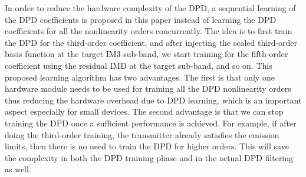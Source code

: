 \documentclass[9pt,conference]{IEEEtran}
\begin{document}
\begin{spacing}{0.88}
In order to reduce the hardware complexity of the DPD, a sequential learning of the DPD coefficients is proposed in this paper instead of learning the DPD coefficients for all the nonlinearity orders concurrently. The idea is to first train the DPD for the third-order coefficient, and after injecting the scaled third-order basis function at the target IM3 sub-band, we start training for the fifth-order coefficient using the residual IMD at the target sub-band, and so on. This proposed learning algorithm has two advantages. The first is that only one hardware module needs to be used for training all the DPD nonlinearity orders thus reducing the hardware overhead due to DPD learning, which is an important aspect especially for small devices. The second advantage is that we can stop training the DPD once a sufficient performance is achieved. For example, if after doing the third-order training, the transmitter already satisfies the emission limits, then there is no need to train the DPD for higher orders. This will save the complexity in both the DPD training phase and in the actual DPD filtering as well.


\end{spacing}
\end{document}
